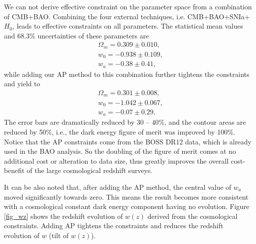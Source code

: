 \documentclass[iop]{emulateapj}
\begin{document}

We can not derive effective constraint on the parameter space from a combination of CMB+BAO.
Combining the four external techniques, i.e. CMB+BAO+SNIa+$H_0$, leads to effective constraints on all parameters.
The statistical mean values and 68.3\% uncertainties of these parameters are
\begin{eqnarray}
&\Omega_m = 0.309 \pm 0.010,\\
&w_0 = -0.938 \pm 0.109,\\
&w_a = -0.38 \pm 0.41,
\end{eqnarray}
while adding our AP method to this combination further tightens the constraints and yield to
\begin{eqnarray}
&\Omega_m = 0.301 \pm 0.008,\\
&w_0 = -1.042 \pm 0.067,\\
&w_a = -0.07 \pm 0.29.
\end{eqnarray}
The error bars are dramatically reduced by 30 -- 40\%,
and the contour areas are reduced by 50\%, i.e., the dark energy figure of merit was improved by 100\%. 
Notice that the AP constraints come from the BOSS DR12 data, which is already used in the BAO analysis.
So the doubling of the figure of merit comes at no additional cost or alteration to data size,
thus greatly improves the overall cost-benefit of the large cosmological redshift surveys.


It can be also noted that, after adding the AP method, the central value of $w_a$ moved significantly towards zero.
This means the result becomes more consistent with a cosmological constant dark energy component having no evolution.
Figure \ref{fig_wz} shows the redshift evolution of $w(z)$ derived from the cosmological constraints.
Adding AP tightens the constraints and reduces the redshift evolution of $w$ (tilt of $w(z)$).
\end{document}
